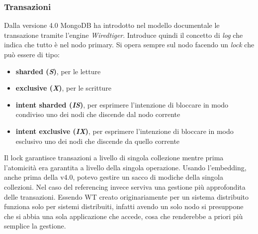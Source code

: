 \documentclass[a4paper,12pt, oneside]{book}
\begin{document}
\subsubsection{Transazioni}
Dalla versione 4.0 MongoDB ha introdotto nel modello documentale le transazione
tramite l'engine \textit{Wiredtiger}. Introduce quindi il concetto di
\textit{log} che indica che tutto è nel nodo primary. Si opera sempre sul nodo
facendo un \textit{lock} che può essere di tipo:
\begin{itemize}
  \item \textbf{sharded (\textit{S})}, per le letture
  \item \textbf{exclusive (\textit{X})}, per le scritture
  \item \textbf{intent sharded (\textit{IS})}, per esprimere l'intenzione di
  bloccare in modo condiviso uno dei nodi che discende dal nodo corrente
  \item \textbf{intent exclusive (\textit{IX})}, per esprimere l'intenzione di
  bloccare in modo esclusivo uno dei nodi che discende da quello corrente
\end{itemize}
Il lock garantisce transazioni a livello di singola collezione mentre prima
l'atomicità era garantita a livello della singola operazione. Usando
l'embedding, anche prima della v4.0, potevo gestire un sacco di modiche della
singola collezioni. Nel caso del referencing invece serviva una gestione più
approfondita delle transazioni. Essendo WT creato originariamente per un sistema
distribuito funziona solo per sistemi distribuiti, infatti avendo un solo nodo
si presuppone che si abbia una sola applicazione che accede, cosa che renderebbe
a priori più semplice la gestione.
\end{document}

